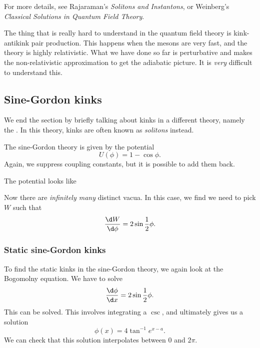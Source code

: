 \documentclass[a4paper]{article}
\begin{document}
For more details, see Rajaraman's \emph{Solitons and Instantons}, or Weinberg's \emph{Classical Solutions in Quantum Field Theory}.

The thing that is really hard to understand in the quantum field theory is kink-antikink pair production. This happens when the mesons are very fast, and the theory is highly relativistic. What we have done so far is perturbative and makes the non-relativistic approximation to get the adiabatic picture. It is \emph{very} difficult to understand this.

\subsection{Sine-Gordon kinks}
We end the section by briefly talking about kinks in a different theory, namely the . In this theory, kinks are often known as \emph{solitons} instead.

The sine-Gordon theory is given by the potential
\[
  U(\phi) = 1 - \cos \phi.
\]
Again, we suppress coupling constants, but it is possible to add them back.

The potential looks like
\begin{center}
\end{center}
Now there are \emph{infinitely many} distinct vacua. In this case, we find we need to pick $W$ such that
\[
  \frac{\d W}{\d \phi} = 2 \sin \frac{1}{2}\phi.
\]

\subsubsection*{Static sine-Gordon kinks}
To find the static kinks in the sine-Gordon theory, we again look at the Bogomolny equation. We have to solve
\[
  \frac{\d \phi}{\d x} = 2 \sin \frac{1}{2}\phi.
\]
This can be solved. This involves integrating a $\csc$, and ultimately gives us a solution
\[
  \phi(x) = 4 \tan^{-1} e^{x - a}.
\]
We can check that this solution interpolates between $0$ and $2\pi$.
\end{document}
